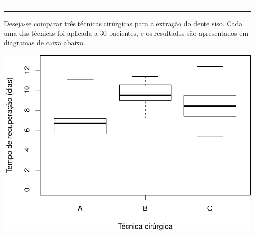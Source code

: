 \documentclass[a4paper,11pt,fleqn]{article}\usepackage[]{graphicx}\usepackage[]{color}
\newenvironment{knitrout}{}{} %
\theoremstyle{definition}
\begin{document}


\vspace{0.3cm}
\hrule
\vspace{0.3cm}

\clearpage

\vspace{0.3cm}
\hrule
\vspace{0.3cm}

\begin{compactenum}[5.] %
\item Deseja-se comparar três técnicas cirúrgicas para a extração do
  dente siso. Cada uma das técnicas foi aplicada a 30 pacientes, e os
  resultados são apresentados em diagramas de caixa abaixo.\vspace{1em}
\begin{knitrout}\small
{}\color{fgcolor}

{\centering \includegraphics[width=.5\textwidth]{figure/siso-1} 

}




\end{knitrout}
\end{compactenum}
\end{document}
